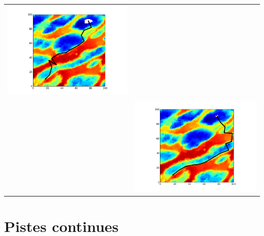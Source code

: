 \documentclass[11pt]{beamer}
\begin{document}
\begin{frame}[Résultats]
{\begin{tabular}{cc}
\includegraphics[scale=0.25]{../data/greedy/plot_A_10_17_B_91_77_iteration_015.png} \\
&\includegraphics[scale=0.25]{../data/None_dijkstra/plot_A_10_17_B_91_77_iteration_015.png} \\
\end{tabular}
}
\end{frame}
\section{Pistes continues}


\end{document}
